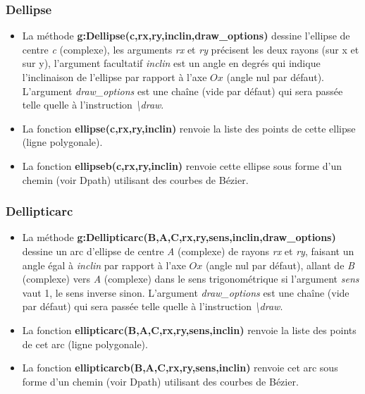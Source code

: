 \documentclass[%
10pt,%
a4paper,%
french,%
]%
{article}%
\begin{document}
\subsubsection{Dellipse}
\begin{itemize}
    \item  La méthode \textbf{g:Dellipse(c,rx,ry,inclin,draw\_options)} dessine l'ellipse de centre \emph{c} (complexe), les arguments \emph{rx} et \emph{ry} précisent les deux rayons (sur x et sur y), l'argument facultatif \emph{inclin} est un angle en degrés qui indique l'inclinaison de l'ellipse par rapport à l'axe \(Ox\) (angle nul par défaut). L'argument \emph{draw\_options} est une chaîne (vide par défaut) qui sera passée telle quelle à l'instruction \emph{\textbackslash draw}.
  \item La fonction \textbf{ellipse(c,rx,ry,inclin)} renvoie la liste des points de cette ellipse (ligne polygonale). 
  \item La fonction \textbf{ellipseb(c,rx,ry,inclin)} renvoie cette ellipse sous forme d'un chemin (voir Dpath) utilisant des courbes de Bézier.
\end{itemize}

\subsubsection{Dellipticarc}
\begin{itemize}
    \item La méthode \textbf{g:Dellipticarc(B,A,C,rx,ry,sens,inclin,draw\_options)} dessine un arc d'ellipse de centre \emph{A} (complexe) de rayons \emph{rx} et \emph{ry}, faisant un angle égal à \emph{inclin} par rapport à l'axe \(Ox\) (angle nul par défaut), allant de \emph{B} (complexe) vers \emph{A} (complexe) dans le sens trigonométrique si l'argument \emph{sens} vaut 1, le sens inverse sinon. L'argument \emph{draw\_options} est une chaîne (vide par défaut) qui sera passée telle quelle à l'instruction \emph{\textbackslash draw}.
    \item La fonction \textbf{ellipticarc(B,A,C,rx,ry,sens,inclin)} renvoie la liste des points de cet arc (ligne polygonale). 
    \item La fonction \textbf{ellipticarcb(B,A,C,rx,ry,sens,inclin)} renvoie cet arc sous forme d'un chemin (voir Dpath) utilisant des courbes de Bézier.
\end{itemize}
\end{document}
